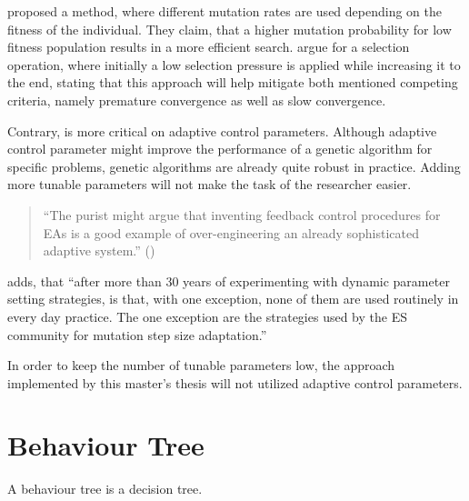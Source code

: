 \cite{marsili_libelli_adaptive_2000} proposed a method, where different mutation rates are used depending on the fitness of the individual. They claim, that a higher mutation probability for low fitness population results in a more efficient search. \cite{hussain_trade-off_2020} argue for a selection operation, where initially a low selection pressure is applied while increasing it to the end, stating that this approach will help mitigate both mentioned competing criteria, namely premature convergence as well as slow convergence.

Contrary, \cite{kacprzyk_parameter_2007} is more critical on adaptive control parameters. Although adaptive control parameter might improve the performance of a genetic algorithm for specific problems, genetic algorithms are already quite robust in practice. Adding more tunable parameters will not make the task of the researcher easier.

\begin{quote}
	\begin{em}
		\enquote{The purist might argue that inventing feedback control procedures for EAs is a good example of over-engineering an already sophisticated adaptive system.} (\cite{kacprzyk_parameter_2007})
	\end{em}
\end{quote}

\cite{kacprzyk_parameter_2007} adds, that \enquote{after more than 30 years of experimenting with dynamic parameter setting strategies, is that, with one exception, none of them are used routinely in every day practice. The one exception are the strategies used by the ES community for mutation step size adaptation.}

In order to keep the number of tunable parameters low, the approach implemented by this master's thesis will not utilized adaptive control parameters.

\section{Behaviour Tree}
A behaviour tree is a decision tree. 
